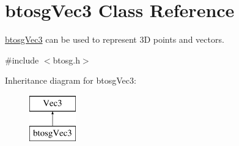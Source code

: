 \hypertarget{classbtosgVec3}{}\section{btosg\+Vec3 Class Reference}
\label{classbtosgVec3}


\mbox{\hyperlink{classbtosgVec3}{btosg\+Vec3}} can be used to represent 3D points and vectors.  




{\ttfamily \#include $<$btosg.\+h$>$}

Inheritance diagram for btosg\+Vec3\+:\begin{figure}[H]
\begin{center}
\leavevmode
\includegraphics[height=2.000000cm]{classbtosgVec3}
\end{center}
\end{figure}
